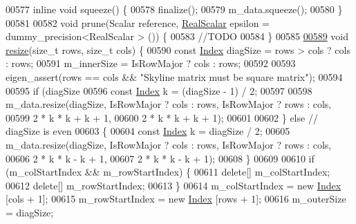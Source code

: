 \begin{DoxyCode}
00577     \textcolor{keyword}{inline} \textcolor{keywordtype}{void} squeeze() \{
00578         finalize();
00579         m\_data.squeeze();
00580     \}
00581 
00582     \textcolor{keywordtype}{void} prune(Scalar reference, \hyperlink{class_eigen_1_1_skyline_matrix_base_a24c532ab7e339b956a637a4a968e1565}{RealScalar} epsilon = dummy\_precision<RealScalar > ()) \{
00583         \textcolor{comment}{//TODO}
00584     \}
00585 
\hyperlink{class_eigen_1_1_skyline_matrix_a918eed5cc583f6d402f0db60c5c5ad52}{00589}     \textcolor{keywordtype}{void} \hyperlink{class_eigen_1_1_skyline_matrix_a918eed5cc583f6d402f0db60c5c5ad52}{resize}(\textcolor{keywordtype}{size\_t} rows, \textcolor{keywordtype}{size\_t} cols) \{
00590         \textcolor{keyword}{const} \hyperlink{group___core___module_a554f30542cc2316add4b1ea0a492ff02}{Index} diagSize = rows > cols ? cols : rows;
00591         m\_innerSize = IsRowMajor ? cols : rows;
00592 
00593         eigen\_assert(rows == cols && \textcolor{stringliteral}{"Skyline matrix must be square matrix"});
00594 
00595         \textcolor{keywordflow}{if} (diagSize %
00596             \textcolor{keyword}{const} \hyperlink{group___core___module_a554f30542cc2316add4b1ea0a492ff02}{Index} k = (diagSize - 1) / 2;
00597 
00598             m\_data.resize(diagSize, IsRowMajor ? cols : rows, IsRowMajor ? rows : cols,
00599                     2 * k * k + k + 1,
00600                     2 * k * k + k + 1);
00601 
00602         \} \textcolor{keywordflow}{else} \textcolor{comment}{// diagSize is even}
00603         \{
00604             \textcolor{keyword}{const} \hyperlink{group___core___module_a554f30542cc2316add4b1ea0a492ff02}{Index} k = diagSize / 2;
00605             m\_data.resize(diagSize, IsRowMajor ? cols : rows, IsRowMajor ? rows : cols,
00606                     2 * k * k - k + 1,
00607                     2 * k * k - k + 1);
00608         \}
00609 
00610         \textcolor{keywordflow}{if} (m\_colStartIndex && m\_rowStartIndex) \{
00611             \textcolor{keyword}{delete}[] m\_colStartIndex;
00612             \textcolor{keyword}{delete}[] m\_rowStartIndex;
00613         \}
00614         m\_colStartIndex = \textcolor{keyword}{new} \hyperlink{group___core___module_a554f30542cc2316add4b1ea0a492ff02}{Index} [cols + 1];
00615         m\_rowStartIndex = \textcolor{keyword}{new} \hyperlink{group___core___module_a554f30542cc2316add4b1ea0a492ff02}{Index} [rows + 1];
00616         m\_outerSize = diagSize;

\end{DoxyCode}
